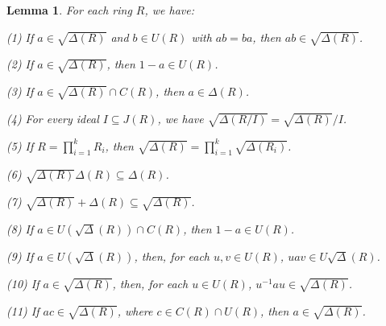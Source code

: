 \documentclass[11pt]{amsart}
\newtheorem{lemma}[theorem]{Lemma}
\theoremstyle{definition}
\begin{document}

\begin{lemma}\label{property of J sharp}
For each ring \( R \), we have:

(1) If \( a \in \sqrt{\Delta(R)} \) and \( b \in U(R) \) with \( ab = ba \), then \( ab \in \sqrt{\Delta(R)} \).

(2) If \( a \in \sqrt{\Delta(R)} \), then \( 1 - a \in U(R) \).

(3) If \( a \in \sqrt{\Delta(R)} \cap C(R) \), then \( a \in \Delta(R) \).

(4) For every ideal \( I \subseteq J(R) \), we have \( \sqrt{\Delta(R/I)} = \sqrt{\Delta(R)}/I \).

(5) If \( R = \prod_{i=1}^k R_i \), then \( \sqrt{\Delta(R)} = \prod_{i=1}^k \sqrt{\Delta(R_i)} \).

(6) $\sqrt{\Delta(R)} \Delta(R) \subseteq \Delta(R)$.

(7) $\sqrt{\Delta(R)} + \Delta(R) \subseteq \sqrt{\Delta(R)}$.

(8) If $a\in U(\sqrt{\Delta}(R))\cap C(R)$, then $1-a\in U(R)$.

(9) If $a\in U(\sqrt{\Delta}(R))$, then, for each $u,v\in U(R)$, $uav\in U\sqrt{\Delta}(R)$.

(10) If $a\in \sqrt{\Delta(R)}$, then, for each $u\in U(R)$, $u^{-1}au\in \sqrt{\Delta(R)}$.

(11) If $ac\in\sqrt{\Delta(R)}$, where $c\in C(R)\cap U(R)$, then $a\in \sqrt{\Delta(R)}$.
\end{lemma}
\end{document}
